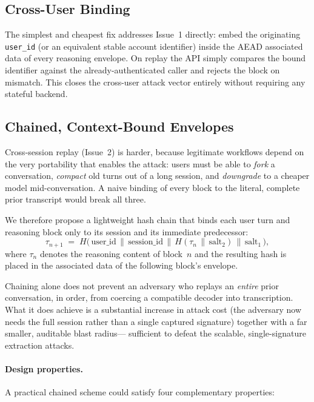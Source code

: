 \subsection{Cross-User Binding}
\label{sec:cross-user-binding}

The simplest and cheapest fix addresses Issue~1 directly: embed the
originating \texttt{user\_id} (or an equivalent stable account
identifier) inside the AEAD associated data of every reasoning envelope.
On replay the API simply compares the bound identifier against the
already-authenticated caller and rejects the block on mismatch.
This closes the cross-user attack vector entirely without requiring any stateful backend.

\subsection{Chained, Context-Bound Envelopes}
\label{sec:chained-binding}

Cross-session replay (Issue~2) is harder, because legitimate workflows
depend on the very portability that enables the attack: users must be
able to \emph{fork} a conversation, \emph{compact} old turns out of a
long session, and \emph{downgrade} to a cheaper model mid-conversation.
A naive binding of every block to the literal, complete prior transcript
would break all three.

We therefore propose a lightweight hash chain that binds each user turn and reasoning
block only to its session and its immediate predecessor:
\begin{equation}
\label{eq:chain}
\tau_{n+1}
\;=\;
H\bigl(\,
  \text{user\_id}
  \,\|\,
  \text{session\_id}
  \,\|\,
  H(\tau_n \,\|\, \text{salt}_2)
  \,\|\,
  \text{salt}_1
\,\bigr),
\end{equation}
where $\tau_n$ denotes the reasoning content of block~$n$ and the resulting
hash is placed in the associated data of the following block's envelope.

Chaining alone does not prevent an adversary who replays an \emph{entire}
prior conversation, in order, from coercing a compatible decoder into
transcription.  What it does achieve is a substantial increase in attack
cost (the adversary now needs the full session rather than a single
captured signature) together with a far smaller, auditable blast radius---
sufficient to defeat the scalable, single-signature extraction attacks.

\paragraph{Design properties.}
A practical chained scheme could satisfy four complementary properties:

